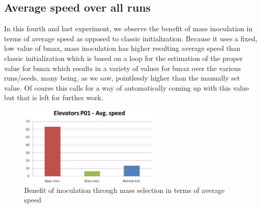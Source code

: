 \documentclass[english]{DESCARWINreport}
\begin{document}
\subsection{Average speed over all runs}

In this fourth and last experiment, we observe the benefit of mass inoculation in terms of average speed as opposed to classic initialization. Because it uses a fixed, low value of bmax, mass inoculation has higher resulting average speed than classic initialization which is based on a loop for the estimation of the proper value for bmax which results in a variety of values for bmax over the various runs/seeds, many being, as we saw, pointlessly higher than the manually set value. Of course this calls for a way of automatically coming up with this value but that is left for further work.

\begin{figure}
	\centering
		\includegraphics[width=0.6\textwidth]{pics/speed_elevators.eps}
	\caption{Benefit of inoculation through mass selection in terms of average speed}
	\label{fig:bmax}
\end{figure}





\end{document}
